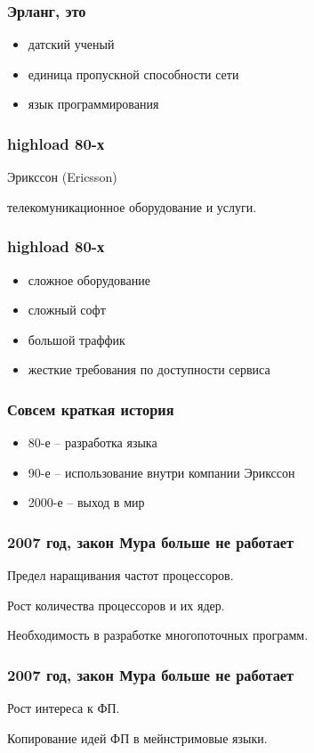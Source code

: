 \documentclass[10pt]{beamer}
\begin{document}
\begin{frame}
\frametitle{Эрланг, это}
\begin{itemize}
\item датский ученый
\item единица пропускной способности сети
\item язык программирования
\end{itemize}
\end{frame}

\begin{frame}
\frametitle{highload 80-х}
\centering
Эрикссон (Ericsson)
\par \bigskip
телекомуникационное оборудование и услуги.
\end{frame}

\begin{frame}
\frametitle{highload 80-х}
\begin{itemize}
\item сложное оборудование
\item сложный софт
\item большой траффик
\item жесткие требования по доступности сервиса
\end{itemize}
\end{frame}

\begin{frame}
\frametitle{Совсем краткая история}
\begin{itemize}
\item 80-е -- разработка языка
\item 90-е -- использование внутри компании Эрикссон
\item 2000-е -- выход в мир
\end{itemize}
\end{frame}

\begin{frame}
\frametitle{2007 год, закон Мура больше не работает}
\centering
Предел наращивания частот процессоров.
\par \bigskip
Рост количества процессоров и их ядер.
\par \bigskip
Необходимость в разработке многопоточных программ.
\end{frame}

\begin{frame}
\frametitle{2007 год, закон Мура больше не работает}
\centering
Рост интереса к ФП.
\par \bigskip
Копирование идей ФП в мейнстримовые языки.
\end{frame}
\end{document}
